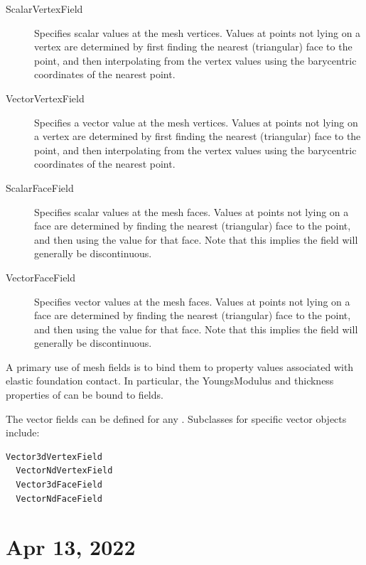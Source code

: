 \documentclass{article}
\begin{document}
\begin{description}

\item[ScalarVertexField]\mbox{}

Specifies scalar values at the mesh vertices. Values at points not
lying on a vertex are determined by first finding the nearest
(triangular) face to the point, and then interpolating from the vertex
values using the barycentric coordinates of the nearest point.

\item[VectorVertexField]\mbox{}

Specifies a vector value at the mesh vertices. Values at points not
lying on a vertex are determined by first finding the nearest
(triangular) face to the point, and then interpolating from the vertex
values using the barycentric coordinates of the nearest point.

\item[ScalarFaceField]\mbox{}

Specifies scalar values at the mesh faces. Values at points not lying
on a face are determined by finding the nearest (triangular) face to
the point, and then using the value for that face. Note that this
implies the field will generally be discontinuous.

\item[VectorFaceField]\mbox{}

Specifies vector values at the mesh faces. Values at points not lying
on a face are determined by finding the nearest (triangular) face to
the point, and then using the value for that face. Note that this
implies the field will generally be discontinuous. 

\end{description}

A primary use of mesh fields is to bind them to property values
associated with elastic foundation contact. In particular, the {\sf
YoungsModulus} and {\sf thickness} properties of
 can be
bound to fields.

The vector fields can be defined for any
.  Subclasses for specific
vector objects include:
%
\begin{lstlisting}[]
  Vector3dVertexField
  VectorNdVertexField
  Vector3dFaceField
  VectorNdFaceField
\end{lstlisting}
%

\section*{Apr 13, 2022}
\end{document}
